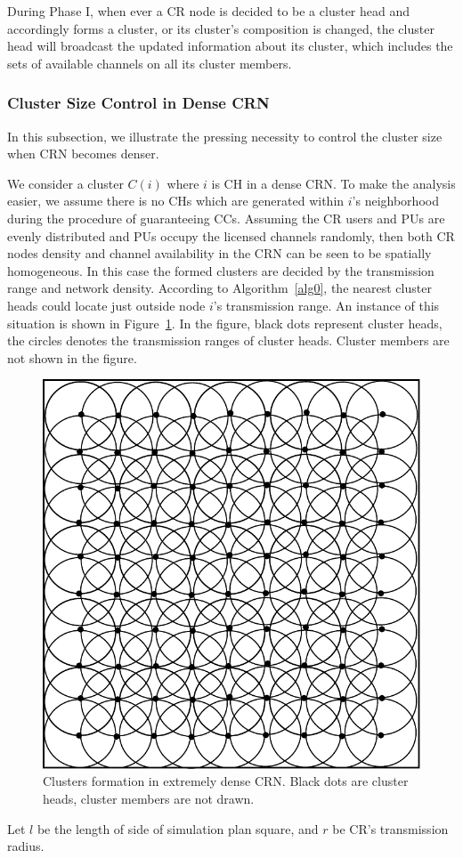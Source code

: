 \documentclass[10pt,journal,compsoc]{IEEEtran}
\theoremstyle{mytheoremstyle}
\theoremstyle{mytheoremstyle}
\theoremstyle{mytheoremstyle}
\begin{document}
During Phase I, when ever a CR node is decided to be a cluster head and accordingly forms a cluster, or its cluster's composition is changed, the cluster head will broadcast the updated information about its cluster, which includes the sets of available channels on all its cluster members.


\subsubsection{Cluster Size Control in Dense CRN}
\label{ross_p2_cluster_pruning}

In this subsection, we illustrate the pressing necessity to control the cluster size when CRN becomes denser.


We consider a cluster $C(i)$ where $i$ is CH in a dense CRN. 
To make the analysis easier, we assume there is no CHs which are generated within $i$'s neighborhood during the procedure of guaranteeing CCs.
Assuming the CR users and PUs are evenly distributed and PUs occupy the licensed channels randomly, then both CR nodes density and channel availability in the CRN can be seen to be spatially homogeneous.
In this case the formed clusters are decided by the transmission range and network density.
According to Algorithm~\ref{alg0}, the nearest cluster heads could locate just outside node $i$'s transmission range.
%
An instance of this situation is shown in Figure~\ref{clusters_denseNetwork}.
In the figure, black dots represent cluster heads, the circles denotes the transmission ranges of cluster heads.
Cluster members are not shown in the figure.
\begin{figure}[h!]
  \centering
  \includegraphics[width=0.3\linewidth]{clusters_denseNetwork_2.pdf}
  \caption{Clusters formation in extremely dense CRN. Black dots are cluster heads, cluster members are not drawn.}
  \label{clusters_denseNetwork}
\end{figure}
Let $l$ be the length of side of simulation plan square, and $r$ be CR's transmission radius.
\end{document}
